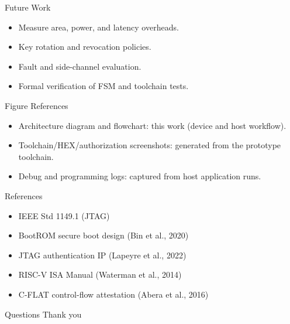 \documentclass[aspectratio=169]{beamer}
\begin{document}
\begin{frame}{Future Work}
  \begin{itemize}
    \item Measure area, power, and latency overheads.
    \item Key rotation and revocation policies.
    \item Fault and side-channel evaluation.
    \item Formal verification of FSM and toolchain tests.
  \end{itemize}
\end{frame}

\begin{frame}{Figure References}
  \begin{itemize}
    \item Architecture diagram and flowchart: this work (device and host workflow).
    \item Toolchain/HEX/authorization screenshots: generated from the prototype toolchain.
    \item Debug and programming logs: captured from host application runs.
  \end{itemize}
\end{frame}

\begin{frame}{References}
  \begin{itemize}
    \item IEEE Std 1149.1 (JTAG)
    \item BootROM secure boot design (Bin et al., 2020)
    \item JTAG authentication IP (Lapeyre et al., 2022)
    \item RISC-V ISA Manual (Waterman et al., 2014)
    \item C-FLAT control-flow attestation (Abera et al., 2016)
  \end{itemize}
\end{frame}

\begin{frame}{Questions}
  \centering
  {\Large Thank you}
\end{frame}
\end{document}
